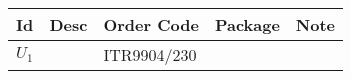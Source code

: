 \begin{table}[H]
    \centering
    \begin{threeparttable}[b]
        \begin{tabularx}{\linewidth}{
                >{\hsize=0.25\hsize}X
                >{\hsize=1.75\hsize}X
                >{\hsize=1.5\hsize}X
                >{\hsize=0.5\hsize}X
                >{\hsize=1\hsize}X}

            Id    & Desc                          & Order Code  & Package & Note \\
            \midrule
            $U_1$ & \cite{everlight_itr9904_2010} & ITR9904/230 &         &      \\
        \end{tabularx}
    \end{threeparttable}
\end{table}